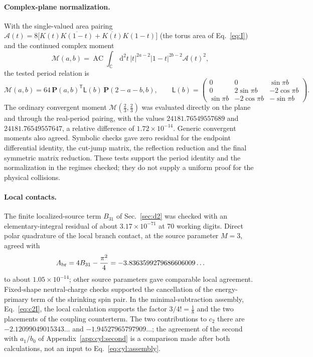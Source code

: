 \documentclass[11pt,a4paper]{article}
\numberwithin{equation}{section}
\newcommand{\dd}{\,\mathrm d}
\newcommand{\AC}{\operatorname{AC}}
\newcommand{\sci}[2]{#1\times10^{#2}}
\begin{document}
\paragraph{Complex-plane normalization.} With the single-valued area pairing
$\mathcal A(t)=8\bigl[K(t)\overline{K(1-t)}+\overline{K(t)}K(1-t)\bigr]$ (the torus area of Eq.~\eqref{eq:I}) and the
continued complex moment
\begin{equation}
 \mathcal M(a,b)=\AC\!\int_{\mathbb C}\dd^2t\,|t|^{2a-2}|1-t|^{2b-2}\mathcal A(t)^2,
\end{equation}
the tested period relation is
\begin{equation}
 \mathcal M(a,b)=64\,\mathbf P(a,b)^{\mathsf T}\mathsf L(b)\,\mathbf P(2-a-b,b),\qquad
 \mathsf L(b)=\begin{pmatrix}0&0&\sin\pi b\\0&2\sin\pi b&-2\cos\pi b\\ \sin\pi b&-2\cos\pi b&-\sin\pi b\end{pmatrix}.
\end{equation}
The ordinary convergent moment $\mathcal M(\frac23,\frac23)$ was evaluated directly on the plane and through the
real-period pairing, with the values $24181.76549557689$ and $24181.76549557647$, a relative difference of
$\sci{1.72}{-14}$. Generic convergent moments also agreed. Symbolic checks gave zero residual for the endpoint
differential identity, the cut-jump matrix, the reflection reduction and the final symmetric matrix reduction. These
tests support the period identity and the normalization in the regimes checked; they do not supply a uniform proof for
the physical collisions.

\paragraph{Local contacts.} The finite localized-source term $B_{31}$ of Sec.~\ref{sec:d2} was checked with an
elementary-integral residual of about $\sci{3.17}{-71}$ at 70 working digits. Direct polar quadrature of the local
branch contact, at the source parameter $M=3$, agreed with
\begin{equation}
 A_{\rm br}=4B_{31}-\frac{\pi^2}4=-3.8363599279686606009\ldots
\end{equation}
to about $\sci{1.05}{-14}$; other source parameters gave comparable local agreement. Fixed-shape neutral-charge checks
supported the cancellation of the energy-primary term of the shrinking spin pair. In the minimal-subtraction assembly,
Eq.~\eqref{eq:c2I}, the local calculation supports the factor $3/4!=\frac18$ and the two placements of the coupling
counterterm. The two contributions to $c_2$ there are $-2.12099049015343\ldots$ and $-1.94527965797909\ldots$; the
agreement of the second with $a_1/b_0$ of Appendix~\ref{app:cyl:second} is a comparison made after both calculations, not
an input to Eq.~\eqref{eq:cyl:assembly}.
\end{document}
